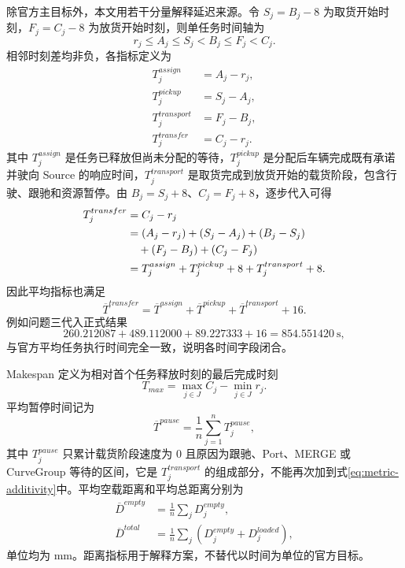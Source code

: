 \documentclass[UTF8]{ctexart}
\begin{document}
除官方主目标外，本文用若干分量解释延迟来源。令 $S_j=B_j-8$ 为取货开始时刻，$F_j=C_j-8$ 为放货开始时刻，则单任务时间轴为
\begin{equation}
r_j\le A_j\le S_j<B_j\le F_j<C_j.
\end{equation}
相邻时刻差均非负，各指标定义为
\begin{align}
T_j^{assign}&=A_j-r_j,\\
T_j^{pickup}&=S_j-A_j,\\
T_j^{transport}&=F_j-B_j,\\
T_j^{transfer}&=C_j-r_j.
\end{align}
其中 $T_j^{assign}$ 是任务已释放但尚未分配的等待，$T_j^{pickup}$ 是分配后车辆完成既有承诺并驶向 Source 的响应时间，$T_j^{transport}$ 是取货完成到放货开始的载货阶段，包含行驶、跟驰和资源暂停。由 $B_j=S_j+8$、$C_j=F_j+8$，逐步代入可得
\begin{align}\label{eq:metric-additivity}
T_j^{transfer}
&=C_j-r_j\\
&=(A_j-r_j)+(S_j-A_j)+(B_j-S_j)\notag\\
&\quad +(F_j-B_j)+(C_j-F_j)\notag\\
&=T_j^{assign}+T_j^{pickup}+8+T_j^{transport}+8.\notag
\end{align}
因此平均指标也满足
\begin{equation}
\overline T^{transfer}=\overline T^{assign}
+\overline T^{pickup}+\overline T^{transport}+16.
\end{equation}
例如问题三代入正式结果
\begin{equation}
260.212087+489.112000+89.227333+16
=854.551420\ \mathrm{s},
\end{equation}
与官方平均任务执行时间完全一致，说明各时间字段闭合。

Makespan 定义为相对首个任务释放时刻的最后完成时刻
\begin{equation}
T_{max}=\max_{j\in J}C_j-\min_{j\in J}r_j.
\end{equation}
平均暂停时间记为
\begin{equation}
\overline T^{pause}=\frac1n\sum_{j=1}^{n}T_j^{pause},
\end{equation}
其中 $T_j^{pause}$ 只累计载货阶段速度为 0 且原因为跟驰、Port、MERGE 或 CurveGroup 等待的区间，它是 $T_j^{transport}$ 的组成部分，不能再次加到式\eqref{eq:metric-additivity}中。平均空载距离和平均总距离分别为
\begin{align}
\overline D^{empty}&=\frac1n\sum_jD_j^{empty},\\
\overline D^{total}&=\frac1n\sum_j(D_j^{empty}+D_j^{loaded}),
\end{align}
单位均为 mm。距离指标用于解释方案，不替代以时间为单位的官方目标。
\end{document}
